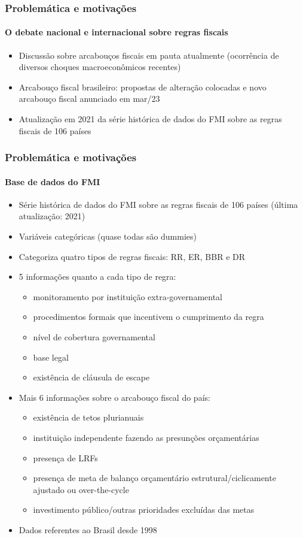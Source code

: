 \documentclass{beamer}
\begin{document}
\begin{frame}
\frametitle{Problemática e motivações}
\framesubtitle{O debate nacional e internacional sobre regras fiscais}
\begin{itemize}
    \item Discussão sobre arcabouços fiscais em pauta atualmente (ocorrência de diversos choques macroeconômicos recentes)
    \item Arcabouço fiscal brasileiro: propostas de alteração colocadas e novo arcabouço fiscal anunciado em mar/23
    \item Atualização em 2021 da série histórica de dados do FMI sobre as regras fiscais de 106 países
\end{itemize}

\end{frame}

\begin{frame}
\frametitle{Problemática e motivações}
\framesubtitle{Base de dados do FMI}

\begin{itemize}
    \item Série histórica de dados do FMI sobre as regras fiscais de 106 países (última atualização: 2021)
    \item Variáveis categóricas (quase todas são dummies)
    \item Categoriza quatro tipos de regras fiscais: RR, ER, BBR e DR
    \item 5 informações quanto a cada tipo de regra:
    \begin{itemize}
        \item monitoramento por instituição extra-governamental 
        \item  procedimentos formais que incentivem o cumprimento da regra 
        \item nível de cobertura governamental 
        \item base legal
        \item existência de cláusula de escape 
    \end{itemize}
    \item Mais 6 informações sobre o arcabouço fiscal do país:
    \begin{itemize}
        \item existência de tetos plurianuais 
        \item instituição independente fazendo as presunções orçamentárias
        \item presença de LRFs
        \item presença de meta de balanço orçamentário estrutural/ciclicamente ajustado ou over-the-cycle 
        \item investimento público/outras prioridades excluídas das metas
    
    \end{itemize}
    \item Dados referentes ao Brasil desde 1998
\end{itemize}
    
\end{frame}
\end{document}
